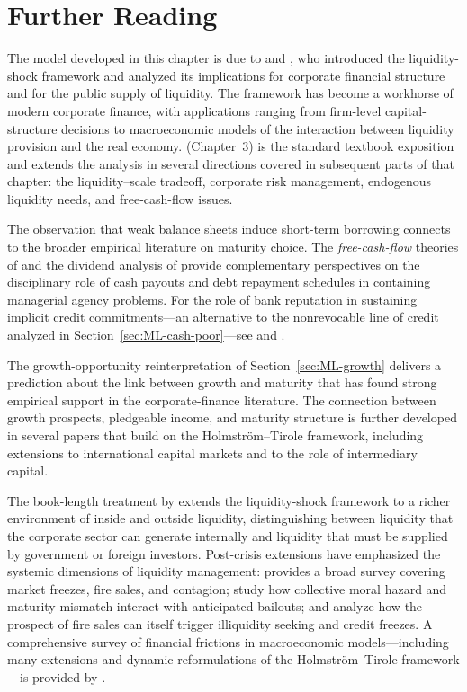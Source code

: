 \documentclass[11pt,a4paper,oneside]{book}
\theoremstyle{plain}
\theoremstyle{definition}
\theoremstyle{remark}
\numberwithin{equation}{chapter}
\begin{document}
\section{Further Reading}
\label{sec:ML-further-reading}

The model developed in this chapter is due to \citet{HolmstromTirole1998} and \citet{HolmstromTirole2000}, who introduced the liquidity-shock framework and analyzed its implications for corporate financial structure and for the public supply of liquidity.
The framework has become a workhorse of modern corporate finance, with applications ranging from firm-level capital-structure decisions to macroeconomic models of the interaction between liquidity provision and the real economy.
\citet{Tirole2006} (Chapter~3) is the standard textbook exposition and extends the analysis in several directions covered in subsequent parts of that chapter: the liquidity--scale tradeoff, corporate risk management, endogenous liquidity needs, and free-cash-flow issues.

The observation that weak balance sheets induce short-term borrowing connects to the broader empirical literature on maturity choice.
The \emph{free-cash-flow} theories of \citet{Jensen1986} and the dividend analysis of \citet{Easterbrook1984} provide complementary perspectives on the disciplinary role of cash payouts and debt repayment schedules in containing managerial agency problems.
For the role of bank reputation in sustaining implicit credit commitments---an alternative to the nonrevocable line of credit analyzed in Section~\ref{sec:ML-cash-poor}---see \citet{BootThakorUdell1987} and \citet{BootGreenbaumThakor1993}.

The growth-opportunity reinterpretation of Section~\ref{sec:ML-growth} delivers a prediction about the link between growth and maturity that has found strong empirical support in the corporate-finance literature.
The connection between growth prospects, pledgeable income, and maturity structure is further developed in several papers that build on the Holmstr\"om--Tirole framework, including extensions to international capital markets and to the role of intermediary capital.

The book-length treatment by \citet{HolmstromTirole2011} extends the liquidity-shock framework to a richer environment of inside and outside liquidity, distinguishing between liquidity that the corporate sector can generate internally and liquidity that must be supplied by government or foreign investors.
Post-crisis extensions have emphasized the systemic dimensions of liquidity management: \citet{Tirole2011} provides a broad survey covering market freezes, fire sales, and contagion; \citet{FarhiTirole2012} study how collective moral hazard and maturity mismatch interact with anticipated bailouts; and \citet{DiamondRajan2011} analyze how the prospect of fire sales can itself trigger illiquidity seeking and credit freezes.
A comprehensive survey of financial frictions in macroeconomic models---including many extensions and dynamic reformulations of the Holmstr\"om--Tirole framework---is provided by \citet{BrunnermeierEisenbachSannikov2013}.
\end{document}
